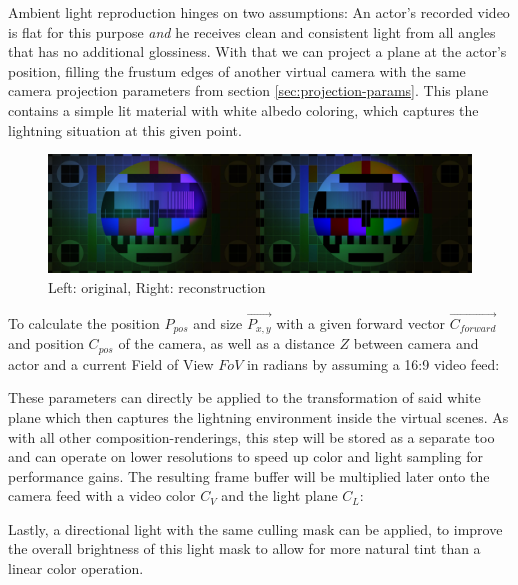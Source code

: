 Ambient light reproduction hinges on two assumptions: An actor's recorded video 
is flat for this purpose \textit{and} he receives clean and consistent light 
from all angles that has no additional glossiness. With that we can project a 
plane at the actor's position, filling the frustum edges of another virtual 
camera with the same camera projection parameters from section 
\ref{sec:projection-params}. This plane contains a simple lit material with 
white albedo coloring, which captures the lightning situation at this given 
point.

\begin{figure}[htb]
	\includegraphics[width=\textwidth]{gfx/recoloring/comparison.jpg}
	\caption{Left: original, Right: reconstruction}
	\label{fig:light-reconstruction:diff-capture}
\end{figure}

To calculate the position $P_{pos}$ and size $\vec{P_{x, y}}$ with a 
given forward vector $\vec{C_{forward}}$ and position $C_{pos}$ of the 
camera, as well as a distance $Z$ between camera and actor and a current Field 
of View $FoV$ in radians by assuming a 16:9 video feed:



These parameters can directly be applied to the transformation of said white 
plane which then captures the lightning environment inside the virtual scenes. 
As with all other composition-renderings, this step will be stored as a 
separate  too and can operate on lower resolutions to speed 
up color and light sampling for performance gains.
\newline
The resulting frame buffer will be multiplied later onto the camera feed with a 
video color $C_V$ and the light plane $C_L$:


Lastly, a directional light with the same culling mask can be applied, to 
improve the overall brightness of this light mask to allow for more natural 
tint than a linear color operation.
